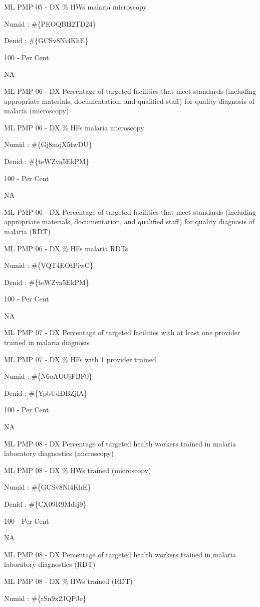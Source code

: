 \documentclass[]{book}
\begin{document}
ML PMP 05 - DX \% HWs malaria microscopy

Numid : \#\{PEOQBH2TD24\}

Denid : \#\{GCSv8Ni4KhE\}

100 - Per Cent

NA

ML PMP 06 - DX Percentage of targeted facilities that meet standards (including appropriate materials, documentation, and qualified staff) for quality diagnosis of malaria (microscopy)

ML PMP 06 - DX \% HFs malaria microscopy

Numid : \#\{Gj8mqX5twDU\}

Denid : \#\{teWZva5EkPM\}

100 - Per Cent

NA

ML PMP 06 - DX Percentage of targeted facilities that meet standards (including appropriate materials, documentation, and qualified staff) for quality diagnosis of malaria (RDT)

ML PMP 06 - DX \% HFs malaria RDTs

Numid : \#\{VQT4EOtPiwC\}

Denid : \#\{teWZva5EkPM\}

100 - Per Cent

NA

ML PMP 07 - DX Percentage of targeted facilities with at least one provider trained in malaria diagnosis

ML PMP 07 - DX \% HFs with 1 provider trained

Numid : \#\{N6oAUOjFBF0\}

Denid : \#\{YpbUdDBZjlA\}

100 - Per Cent

NA

ML PMP 08 - DX Percentage of targeted health workers trained in malaria laboratory diagnostics (microscopy)

ML PMP 08 - DX \% HWs trained (microscopy)

Numid : \#\{GCSv8Ni4KhE\}

Denid : \#\{CX09R9Mdsj9\}

100 - Per Cent

NA

ML PMP 08 - DX Percentage of targeted health workers trained in malaria laboratory diagnostics (RDT)

ML PMP 08 - DX \% HWs trained (RDT)

Numid : \#\{rSn9x2JQPJe\}
\end{document}
